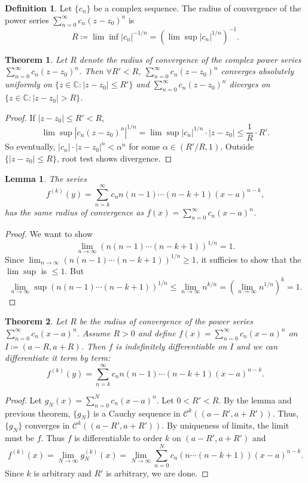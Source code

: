 \documentclass[12pt]{article}
\theoremstyle{plain}
\newtheorem{thm}{Theorem}
\newtheorem*{lemma}{Lemma}
\theoremstyle{definition}
\newtheorem*{defn}{Definition}
\begin{document}
\begin{defn}
    Let $\{c_n\}$ be a complex sequence.  The radius of convergence of the power
    series $\sum_{n=0}^\infty c_n(z-z_0)^n$
    is
    $$R\coloneqq \lim\inf |c_n|^{-1/n}=\left(\lim\sup |c_n|^{1/n}\right)^{-1}.$$
\end{defn}

\begin{thm}
    Let $R$ denote the radius of convergence of the complex power series
    $\sum_{n=0}^\infty c_n(z-z_0)^n$.
    Then $\forall R'<R$, $\sum_{n=0}^\infty c_n(z-z_0)^n$ converges absolutely uniformly on
    $\{z\in\mathbb{C}:|z-z_0|\leq R'\}$ and $\sum_{n=0}^\infty c_n(z-z_0)^n$
    diverges on $\{z\in\mathbb{C}:|z-z_0|>R\}$.
\end{thm}
\begin{proof}
    If $|z-z_0|\leq R'<R$,
    $$\lim\sup \left|c_n(z-z_0)^n\right|^{1/n}=\lim\sup |c_n|^{1/n}\cdot
    |z-z_0|\leq\frac{1}{R}\cdot R'.$$
    So eventually, $|c_n|\cdot|z-z_0|^n<\alpha^n$ for some $\alpha\in(R'/R,1)$.
    Outside $\{|z-z_0|\leq R\}$, root test shows divergence.
\end{proof}

\begin{lemma}
    The series 
    $$f^{(k)}(y)=\sum_{n=k}^\infty c_n n(n-1)\cdots (n-k+1)(x-a)^{n-k},$$
    has the same radius of convergence as $f(x)=\sum_{n=0}^\infty c_n(x-a)^n$.
\end{lemma}
\begin{proof}
    We want to show
    $$\lim_{n\rightarrow\infty}\left(n(n-1)\cdots(n-k+1)\right)^{1/n}=1.$$
    Since $\lim_{n\rightarrow\infty}\left(n(n-1)\cdots(n-k+1)\right)^{1/n}\geq1$,
    it sufficies to show that the $\lim\sup$ is $\leq 1$.
    But 
    $$\lim_{n\rightarrow\infty}\sup \left(n(n-1)\cdots(n-k+1)\right)^{1/n}\leq \lim_{n\rightarrow\infty}
    n^{k/n}=(\lim_{n\rightarrow\infty} n^{1/n})^k=1.$$
\end{proof}

\begin{thm}
    Let $R$ be the radius of convergence of the power series $\sum_{n=0}^\infty c_n (x-a)^n$.
    Assume $R>0$ and define $f(x)=\sum_{n=0}^\infty c_n(x-a)^n$ on $I\coloneqq (a-R,a+R)$.
    Then $f$ is indefinitely differentiable on $I$ and we can differentiate it term by term:
    $$f^{(k)}(y)=\sum_{n=k}^\infty c_n n(n-1)\cdots (n-k+1)(x-a)^{n-k}.$$
\end{thm}
\begin{proof}
    Let $g_N(x)=\sum_{n=0}^N c_n(x-a)^n$.
    Let $0<R'<R$.
    By the lemma and previous theorem, $\{g_N\}$ is a Cauchy sequence in $\mathcal{C}^k((a-R',a+R'))$.
    Thus, $\{g_N\}$ converges in $\mathcal{C}^k((a-R',a+R'))$.
    By uniqueness of limits, the limit must be $f$.
    Thus $f$ is differentiable to order $k$ on $(a-R',a+R')$ and 
    $$f^{(k)}(x)=\lim_{N\rightarrow\infty} g_N^{(k)}(x)=\lim_{N\rightarrow\infty}\sum_{n=0}^N c_n(n\cdots
    (n-k+1))(x-a)^{n-k}.$$
    Since $k$ is arbitrary and $R'$ is arbitrary, we are done.
\end{proof}
\end{document}
